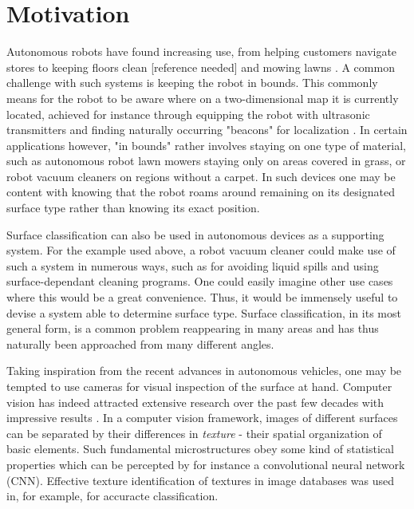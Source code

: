 
\section{Motivation}

Autonomous robots have found increasing use, from helping customers navigate stores \citep{mcsweeney_2018} to keeping floors clean [reference needed] and mowing lawns \citep{udelhofen_2018}. A common challenge with such systems is keeping the robot in bounds. This commonly means for the robot to be aware where on a two-dimensional map it is currently located, achieved for instance through equipping the robot with ultrasonic transmitters and finding naturally occurring "beacons" for localization \citep{leonard_durrant-whyte_1991}. In certain applications however, "in bounds" rather involves staying on one type of material, such as autonomous robot lawn mowers staying only on areas covered in grass, or robot vacuum cleaners on regions without a carpet. In such devices one may be content with knowing that the robot roams around remaining on its designated surface type rather than knowing its exact position. 

Surface classification can also be used in autonomous devices as a supporting system. For the example used above, a robot vacuum cleaner could make use of such a system in numerous ways, such as for avoiding liquid spills and using surface-dependant cleaning programs. One could easily imagine other use cases where this  would be a great convenience. Thus, it would be immensely useful to devise a system able to determine surface type. Surface classification, in its most general form, is a common problem reappearing in many areas and has thus naturally been approached from many different angles. 

Taking inspiration from the recent advances in autonomous vehicles, one may be tempted to use cameras for visual inspection of the surface at hand. Computer vision has indeed attracted extensive research over the past few decades with impressive results \citep{liu_chen_fieguth_zhao_chellappa_pietikäinen_2018}. In a computer vision framework, images of different surfaces can be separated by their differences in \emph{texture} - their spatial organization of basic elements. Such fundamental microstructures obey some kind of statistical properties which can be percepted by for instance a convolutional neural network (CNN). Effective texture identification of textures in image databases was used in, for example, \citep{do_vetterli_2002} for accuracte classification.

